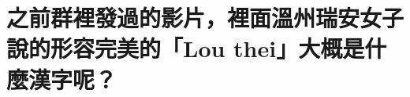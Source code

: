 %

\chapter[之前群裡發過的影片，裡面溫州瑞安女子說的形容完美的「Lou thei」大概是什麼漢字呢？]{之前群裡發過的影片，裡面溫州瑞安女子說的形容完美的「Lou thei」大概是什麼漢字呢？}

